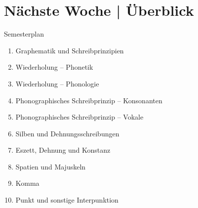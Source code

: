 % 


\ifdefined\TITLE
  \section{Nächste Woche | Überblick}

  \begin{frame}
    {Semesterplan}
    \begin{enumerate}
      \item Graphematik und Schreibprinzipien
      \item Wiederholung -- Phonetik
      \item Wiederholung -- Phonologie
      \item Phonographisches Schreibprinzip -- Konsonanten
      \item Phonographisches Schreibprinzip -- Vokale
      \item Silben und Dehnungsschreibungen
      \item Eszett, Dehnung und Konstanz
      \item Spatien und Majuskeln
      \item \alert{Komma}
      \item Punkt und sonstige Interpunktion
    \end{enumerate}
  \end{frame}
\fi

